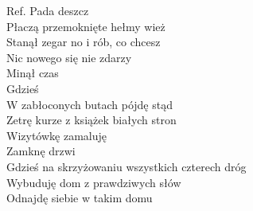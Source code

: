 \begin{flushleft}
\vskip 3mm
Ref. Pada deszcz  \\
\hspace{0.9cm}Płaczą przemoknięte hełmy wież \\
\hspace{0.9cm}Stanął zegar no i rób, co chcesz \\
\hspace{0.9cm}Nic nowego się nie zdarzy \\
\hspace{0.9cm}Minął czas  \\
\hspace{0.9cm}Gdzieś  \\
\hspace{0.9cm}W zabłoconych butach pójdę stąd \\
\hspace{0.9cm}Zetrę kurze z książek białych stron  \\
\hspace{0.9cm}Wizytówkę zamaluję                                                      \\
\hspace{0.9cm}Zamknę drzwi                                                                \\
\hspace{0.9cm}Gdzieś na skrzyżowaniu wszystkich czterech dróg \\
\hspace{0.9cm}Wybuduję dom z prawdziwych słów \\
\hspace{0.9cm}Odnajdę siebie w takim domu \\
\end{flushleft}
\clearpage
